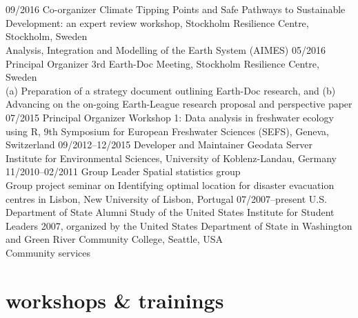 \documentclass[]{friggeri-cv} %
\begin{document}
\section{}
\begin{entrylist}
\entry
{\small{09/2016}}
{Co-organizer}
{}
{Climate Tipping Points and Safe Pathways to Sustainable Development: an expert review workshop, Stockholm Resilience Centre, Stockholm, Sweden\\
Analysis, Integration and Modelling of the Earth System (AIMES)}
\entry
{\small{05/2016}}
{Principal Organizer}
{}
{3rd Earth-Doc Meeting, Stockholm Resilience Centre, Sweden\\
(a) Preparation of a strategy document outlining Earth-Doc research, and (b) Advancing on the on-going Earth-League research proposal and perspective paper}
\entry
{\small{07/2015}}
{Principal Organizer}
{}
{Workshop 1: Data analysis in freshwater ecology using R, 9th Symposium for European Freshwater Sciences (SEFS), Geneva, Switzerland}
\entry
{\small{09/2012--12/2015}}
{Developer and Maintainer}
{}
{Geodata Server \\ 
Institute for Environmental Sciences, University of Koblenz-Landau, Germany}
\entry
{\small{11/2010--02/2011}}
{Group Leader}
{}
{Spatial statistics group \\ 
Group project seminar on Identifying optimal location for disaster evacuation centres in Lisbon, New University of Lisbon, Portugal}
\entry
{\small{07/2007--present}}
{U.S. Department of State Alumni}
{}
{Study of the United States Institute for Student Leaders 2007, organized by the United States Department of State in Washington and Green River Community College, Seattle, USA\\
Community services}
\end{entrylist}

\section{workshops \& trainings}
\end{document}
